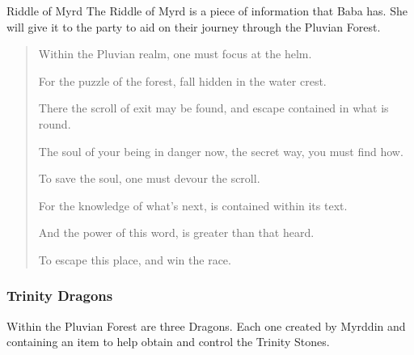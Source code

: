 \begin{commentbox}{Riddle of Myrd}
	The Riddle of Myrd is a piece of information that Baba has. She will give it to the party to aid on their journey through the Pluvian Forest.
	\begin{quote}
		Within the Pluvian realm, one must focus at the helm.
		
		For the puzzle of the forest, fall hidden in the water crest.
		
		There the scroll of exit may be found, and escape contained in what is round.
		
		The soul of your being in danger now, the secret way, you must find how.
		
		To save the soul, one must devour the scroll.
		
		For the knowledge of what's next, is contained within its text.
		
		And the power of this word, is greater than that heard.
		
		To escape this place, and win the race.
	\end{quote}
\end{commentbox}


\subsubsection{Trinity Dragons}

Within the Pluvian Forest are three Dragons. Each one created by Myrddin and containing an item to help obtain and control the Trinity Stones. 

